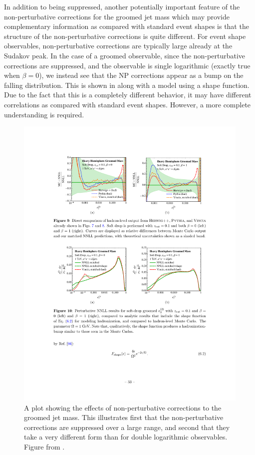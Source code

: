 In addition to being suppressed, another potentially important feature of the non-perturbative corrections for the groomed jet mass which may provide complementary information as compared with standard event shapes is that the structure of the non-perturbative corrections is quite different. For event shape observables, non-perturbative corrections are typically large already at the Sudakov peak. In the case of a groomed observable, since the non-perturbative corrections are suppressed, and the observable is single logarithmic (exactly true when $\beta=0$), we instead see that the NP corrections appear as a bump on the falling distribution. This is shown in  along with a model using a shape function. Due to the fact that this is a completely different behavior, it may have different correlations as compared with standard event shapes. However, a more complete understanding is required. 


\begin{figure}
\begin{center}
\includegraphics[width = 0.6\columnwidth]{figures/shape_function.pdf}
\end{center}
\caption{A plot showing the effects of non-perturbative corrections to the groomed jet mass. This illustrates first that the non-perturbative corrections are suppressed over a large range, and second that they take a very different form than for double logarithmic observables. Figure from \cite{Frye:2016aiz}. }
\label{fig:shape_function}
\end{figure}




